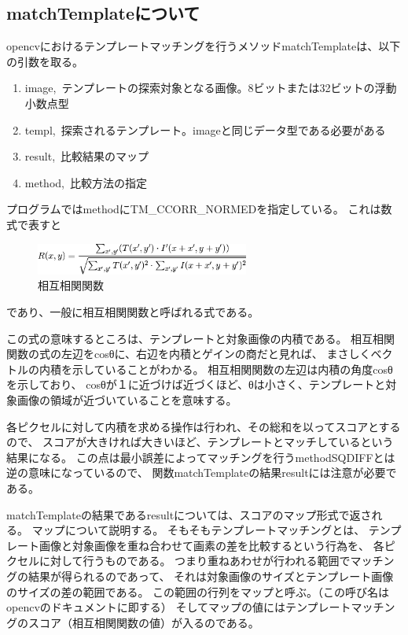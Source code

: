 \documentclass{jsarticle}
\begin{document}
\begin{multicols}{2}
\section{matchTemplateについて}

opencvにおけるテンプレートマッチングを行うメソッドmatchTemplateは、以下の引数を取る。
\begin{enumerate}
\item image,\ テンプレートの探索対象となる画像。8ビットまたは32ビットの浮動小数点型
\item templ,\ 探索されるテンプレート。imageと同じデータ型である必要がある
\item result,\ 比較結果のマップ
\item method,\ 比較方法の指定
\end{enumerate}

プログラムではmethodにTM\_CCORR\_NORMEDを指定している。
これは数式で表すと
\begin{figure}[H]
  \begin{center}
    \includegraphics[clip,width=7.0cm]{./img/ccorr.png}
    \caption{相互相関関数}
    \label{fig:ccorr}
  \end{center}
\end{figure}
であり、一般に相互相関関数と呼ばれる式である。

この式の意味するところは、テンプレートと対象画像の内積である。
相互相関関数の式の左辺をcosθに、右辺を内積とゲインの商だと見れば、
まさしくベクトルの内積を示していることがわかる。
相互相関関数の左辺は内積の角度cosθを示しており、
cosθが１に近づけば近づくほど、θは小さく、テンプレートと対象画像の領域が近づいていることを意味する。

各ピクセルに対して内積を求める操作は行われ、その総和を以ってスコアとするので、
スコアが大きければ大きいほど、テンプレートとマッチしているという結果になる。
この点は最小誤差によってマッチングを行うmethodSQDIFFとは逆の意味になっているので、
関数matchTemplateの結果resultには注意が必要である。

matchTemplateの結果であるresultについては、スコアのマップ形式で返される。
マップについて説明する。
そもそもテンプレートマッチングとは、
テンプレート画像と対象画像を重ね合わせて画素の差を比較するという行為を、
各ピクセルに対して行うものである。
つまり重ねあわせが行われる範囲でマッチングの結果が得られるのであって、
それは対象画像のサイズとテンプレート画像のサイズの差の範囲である。
この範囲の行列をマップと呼ぶ。（この呼び名はopencvのドキュメント\cite{matchTemplateC}\cite{matchTemplatePy}に即する）
そしてマップの値にはテンプレートマッチングのスコア（相互相関関数の値）が入るのである。


\end{multicols}
\end{document}
